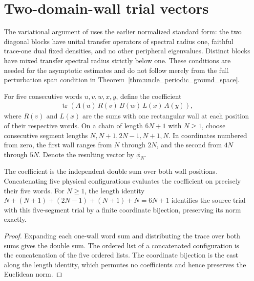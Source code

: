 \section{Two-domain-wall trial vectors}
\label{sec:uncle_two_wall_trial}

The variational argument of
\cite[equation defining $\phi_N$, low-energy-state lemma]{FernandezGonzalez2015Uncle}
uses the earlier normalized standard form: the two diagonal blocks have
unital transfer operators of spectral radius one, faithful trace-one dual
fixed densities, and no other peripheral eigenvalues. Distinct blocks have
mixed transfer spectral radius strictly below one. These conditions are
needed for the asymptotic estimates and do not follow merely from the full
perturbation span condition in Theorem~\ref{thm:uncle_periodic_ground_space}.

\begin{definition}
    \label{def:uncle_two_wall_trial}
    \leanok
    For five consecutive words $u,v,w,x,y$, define the coefficient
    \begin{align}
        \operatorname{tr}\!\left(A(u)\,R(v)\,B(w)\,L(x)\,A(y)\right),
    \end{align}
    where $R(v)$ and $L(x)$ are the sums with one rectangular wall at each
    position of their respective words. On a chain of
    length $6N+1$ with $N\ge1$, choose consecutive segment lengths
    $N,N+1,2N-1,N+1,N$. In coordinates numbered from zero, the first wall
    ranges from $N$ through $2N$, and the second from $4N$ through $5N$.
    Denote the resulting vector by $\phi_N$.
\end{definition}

\begin{lemma}
    \label{lem:uncle_two_wall_trial_coordinates}
    \leanok
    The coefficient is the independent double sum over both wall
    positions. Concatenating five physical configurations evaluates the
    coefficient on precisely their five words. For $N\ge1$, the length
    identity $N+(N+1)+(2N-1)+(N+1)+N=6N+1$ identifies the source trial
    with this five-segment trial by a finite coordinate bijection,
    preserving its norm exactly.
\end{lemma}
\begin{proof}
    \leanok
    Expanding each one-wall word sum and distributing the trace over both
    sums gives the double sum. The ordered list of a concatenated
    configuration is the concatenation of the five ordered lists. The
    coordinate bijection is the cast along the length identity, which
    permutes no coefficients and hence preserves the Euclidean norm.
\end{proof}

